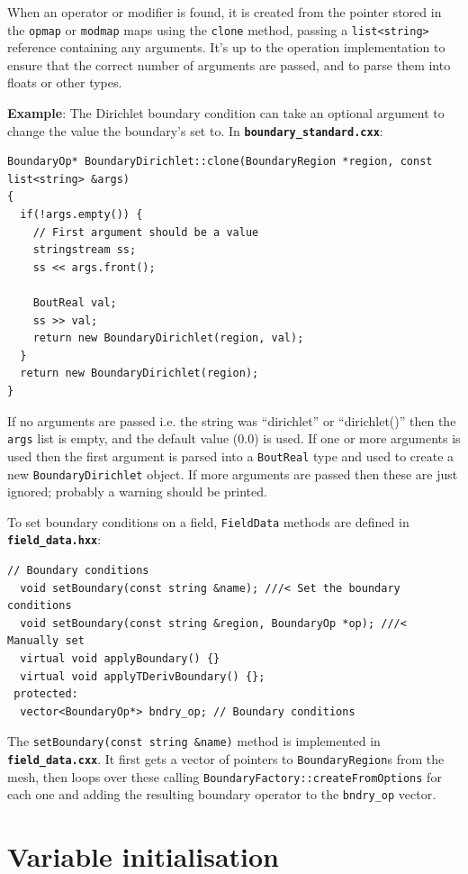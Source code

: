 \documentclass[12pt]{article}
\newcommand{\code}[1]{\texttt{#1}}
\newcommand{\file}[1]{\texttt{\bf #1}}
\begin{document}
When an operator or modifier is found, it is created from the pointer
stored in the \code{opmap} or \code{modmap} maps using the
\code{clone} method, passing
a \code{list<string>} reference containing any arguments. It's up
to the operation implementation to ensure that the correct number of
arguments are passed, and to parse them into floats or other types.

{\bf Example}: The Dirichlet boundary condition can take an optional
argument to change the value the boundary's set to. In \file{boundary\_standard.cxx}:
\begin{lstlisting}[firstnumber=13]
BoundaryOp* BoundaryDirichlet::clone(BoundaryRegion *region, const list<string> &args)
{
  if(!args.empty()) {
    // First argument should be a value
    stringstream ss;
    ss << args.front();
    
    BoutReal val;
    ss >> val;
    return new BoundaryDirichlet(region, val);
  }
  return new BoundaryDirichlet(region);
}
\end{lstlisting}
If no arguments are passed i.e. the string was ``dirichlet'' or ``dirichlet()''
then the \code{args} list is empty, and the default value (0.0) is used.
If one or more arguments is used then the first argument is parsed into a
\code{BoutReal} type and used to create a new \code{BoundaryDirichlet} object.
If more arguments are passed then these are just ignored; probably a warning
should be printed.

To set boundary conditions on a field, \code{FieldData} methods are
defined in \file{field\_data.hxx}: 
\begin{lstlisting}
// Boundary conditions
  void setBoundary(const string &name); ///< Set the boundary conditions
  void setBoundary(const string &region, BoundaryOp *op); ///< Manually set
  virtual void applyBoundary() {}
  virtual void applyTDerivBoundary() {};
 protected:
  vector<BoundaryOp*> bndry_op; // Boundary conditions
\end{lstlisting}
The \code{setBoundary(const string \&name)} method is implemented in
\file{field\_data.cxx}. It first gets a vector of pointers to
\code{BoundaryRegion}s from the mesh, then loops over these calling
\code{BoundaryFactory::createFromOptions} for each one and adding the resulting
boundary operator to the \code{bndry\_op} vector.

\section{Variable initialisation}
\end{document}
